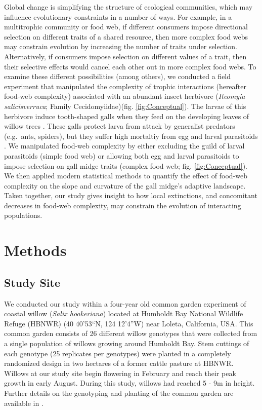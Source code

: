 \documentclass[11pt,]{article}
\begin{document}
Global change is simplifying the structure of ecological communities,
which may influence evolutionary constraints in a number of ways. For
example, in a multitrophic community or food web, if different consumers
impose directional selection on different traits of a shared resource,
then more complex food webs may constrain evolution by increasing the
number of traits under selection. Alternatively, if consumers impose
selection on different values of a trait, then their selective effects
would cancel each other out in more complex food webs. To examine these
different possibilities (among others), we conducted a field experiment
that manipulated the complexity of trophic interactions (hereafter
food-web complexity) associated with an abundant insect herbivore
(\emph{Iteomyia salicisverruca}; Family Cecidomyiidae)(fig.
\ref{fig:Conceptual}). The larvae of this herbivore induce tooth-shaped
galls when they feed on the developing leaves of willow trees
\citep[\emph{Salix} sp.,][]{Russo2006}. These galls protect larva from
attack by generalist predators (e.g.~ants, spiders), but they suffer
high mortaltiy from egg and larval parasitoids \citep{Barbour2016}. We
manipulated food-web complexity by either excluding the guild of larval
parasitoids (simple food web) or allowing both egg and larval
parasitoids to impose selection on gall midge traits (complex food web;
fig. \ref{fig:Conceptual}). We then applied modern statistical methods
to quantify the effect of food-web complexity on the slope and curvature
of the gall midge's adaptive landscape. Taken together, our study gives
insight to how local extinctions, and concomitant decreases in food-web
complexity, may constrain the evolution of interacting populations.

\section{Methods}\label{methods}

\subsection{Study Site}\label{study-site}

We conducted our study within a four-year old common garden experiment
of coastal willow (\emph{Salix hookeriana}) located at Humboldt Bay
National Wildlife Refuge (HBNWR) (40 40'53``N, 124 12'4''W) near Loleta,
California, USA. This common garden consists of 26 different willow
genotypes that were collected from a single population of willows
growing around Humboldt Bay. Stem cuttings of each genotype (25
replicates per genotypes) were planted in a completely randomized design
in two hectares of a former cattle pasture at HBNWR. Willows at our
study site begin flowering in February and reach their peak growth in
early August. During this study, willows had reached 5 - 9m in height.
Further details on the genotyping and planting of the common garden are
available in \citet{Barbour2015}.
\end{document}
